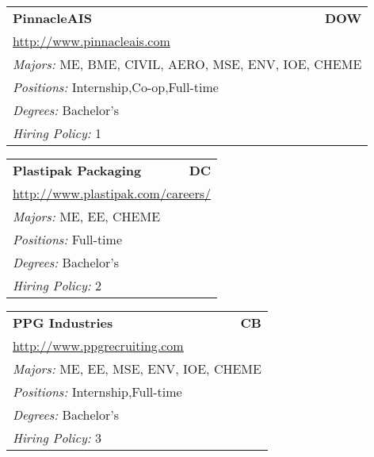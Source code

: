 \documentclass[twoside]{article}
\begin{document}
\begin{center}
\begin{multicols}{3}
\begin{FlushLeft}
\begin{minipage}{.9\columnwidth}
\end{minipage}
 
\begin{minipage}{.9\columnwidth}\begin{tabularx}{.95\columnwidth}{Xr}
                 {\Large\bf PinnacleAIS} & {\Large\bf DOW}\\
    \multicolumn{2}{p{.95\columnwidth}}{\url{http://www.pinnacleais.com}}\\
    \multicolumn{2}{p{.95\columnwidth}}{\emph{Majors:} ME, BME, CIVIL, AERO, MSE, ENV, IOE, CHEME}\\
    \multicolumn{2}{p{.95\columnwidth}}{\emph{Positions:} Internship,Co-op,Full-time}\\
    \multicolumn{2}{p{.95\columnwidth}}{\emph{Degrees:} Bachelor's}\\
    \multicolumn{2}{p{.95\columnwidth}}{\emph{Hiring Policy:} 1}\\
    \end{tabularx}
    
\end{minipage}
 
\begin{minipage}{.9\columnwidth}\begin{tabularx}{.95\columnwidth}{Xr}
                 {\Large\bf Plastipak Packaging} & {\Large\bf DC}\\
    \multicolumn{2}{p{.95\columnwidth}}{\url{http://www.plastipak.com/careers/}}\\
    \multicolumn{2}{p{.95\columnwidth}}{\emph{Majors:} ME, EE, CHEME}\\
    \multicolumn{2}{p{.95\columnwidth}}{\emph{Positions:} Full-time}\\
    \multicolumn{2}{p{.95\columnwidth}}{\emph{Degrees:} Bachelor's}\\
    \multicolumn{2}{p{.95\columnwidth}}{\emph{Hiring Policy:} 2}\\
    \end{tabularx}
    
\end{minipage}
 
\begin{minipage}{.9\columnwidth}\begin{tabularx}{.95\columnwidth}{Xr}
                 {\Large\bf PPG Industries} & {\Large\bf CB}\\
    \multicolumn{2}{p{.95\columnwidth}}{\url{http://www.ppgrecruiting.com}}\\
    \multicolumn{2}{p{.95\columnwidth}}{\emph{Majors:} ME, EE, MSE, ENV, IOE, CHEME}\\
    \multicolumn{2}{p{.95\columnwidth}}{\emph{Positions:} Internship,Full-time}\\
    \multicolumn{2}{p{.95\columnwidth}}{\emph{Degrees:} Bachelor's}\\
    \multicolumn{2}{p{.95\columnwidth}}{\emph{Hiring Policy:} 3}\\
    \end{tabularx}
    

\end{minipage}
\end{FlushLeft}
\end{multicols}
\end{center}
\end{document}

